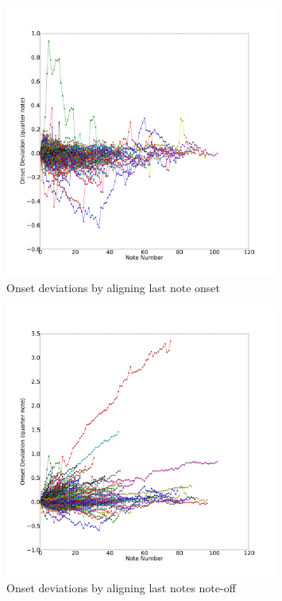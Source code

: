 \begin{figure}[tp]
   \begin{center}
      \includegraphics[width=0.8\textwidth]{fig/lian_onset_2}
   \end{center}
   \caption{Onset deviations by aligning last note onset}
   \label{fig:norm1}
\end{figure}


\begin{figure}[tp]
   \begin{center}
      \includegraphics[width=0.8\textwidth]{fig/lian_onset_4}
   \end{center}
   \caption{Onset deviations by aligning last notes note-off}
   \label{fig:norm3}
\end{figure}

